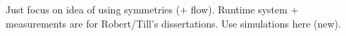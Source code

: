 \Blindtext[15]
Just focus on idea of using symmetries (+ flow). Runtime system + measurements are for Robert/Till's dissertations.
Use simulations here (new).
